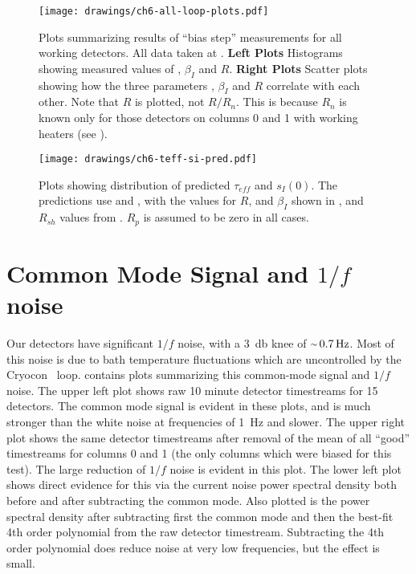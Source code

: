 \begin{figure*}
  \centering
\texttt{[image: drawings/ch6-all-loop-plots.pdf]}
\caption[Plots summarizing results of ``bias step'' measurements for all working detectors]{
  Plots summarizing results of ``bias step'' measurements for all working detectors.
All data taken at \SOC.
\textbf{Left Plots}
Histograms showing measured values of \Loop, $\beta_I$ and $R$.
\textbf{Right Plots}
Scatter plots showing how the three parameters \Loop, $\beta_I$ and $R$ correlate with each other.
Note that $R$ is plotted, not $R/R_n$. This is because $R_n$ is known only for those detectors on columns 0 and 1 with working heaters (see ).
}
\label{fig:ch6-all-loop-plots}
\end{figure*}

\begin{figure*}
  \centering
\texttt{[image: drawings/ch6-teff-si-pred.pdf]}
\caption[Predictions for $\tau_{eff}$ and $s_I(0)$]{
  Plots showing distribution of predicted $\tau_{eff}$ and $s_I(0)$. The predictions use  and , with the values for $R$, \Loop and $\beta_I$ shown in , and $R_{sh}$ values from . $R_p$ is assumed to be zero in all cases.
}
\label{fig:ch6-teff-si-pred}
\end{figure*}

\section{Common Mode Signal and $1/f$ noise} \label{sec:ch6-common}


Our detectors have significant $1/f$ noise, with a \SI{3}{\decibel} knee of $\abt{\SI{0.7}{\hertz}}$.
Most of this noise is due to bath temperature fluctuations which are uncontrolled by the Cryocon \PID\ loop.
 contains plots summarizing this common-mode signal and $1/f$ noise.
The upper left plot shows raw 10 minute detector timestreams for 15 detectors.
The common mode signal is evident in these plots, and is much stronger than the white noise at frequencies of \SI{1}{\Hz} and slower.
The upper right plot shows the same detector timestreams after removal of the mean of all ``good'' timestreams for columns 0 and 1 (the only columns which were biased for this test).
The large reduction of $1/f$ noise is evident in this plot.
The lower left plot shows direct evidence for this via the current noise power spectral density both before and after subtracting the common mode.
Also plotted is the power spectral density after subtracting first the common mode and then the best-fit 4th order polynomial from the raw detector timestream.
Subtracting the 4th order polynomial does reduce noise at very low frequencies, but the effect is small.

